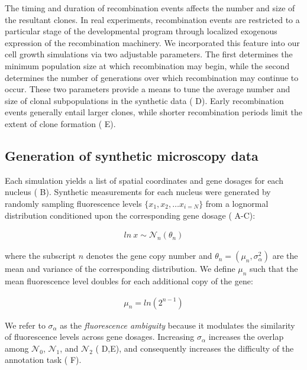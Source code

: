 \documentclass[10pt,letterpaper]{article}
\begin{document}
The timing and duration of recombination events affects the number and size of the resultant clones. In real experiments, recombination events are restricted to a particular stage of the developmental program through localized exogenous expression of the recombination machinery. We incorporated this feature into our cell growth simulations via two adjustable parameters. The first determines the minimum population size at which recombination may begin, while the second determines the number of generations over which recombination may continue to occur. These two parameters provide a means to tune the average number and size of clonal subpopulations in the synthetic data ( D). Early recombination events generally entail larger clones, while shorter recombination periods limit the extent of clone formation ( E).


\subsection*{Generation of synthetic microscopy data}

Each simulation yields a list of spatial coordinates and gene dosages for each nucleus ( B). Synthetic measurements for each nucleus were generated by randomly sampling fluorescence levels $\{x_1, x_2, \ldots x_{i=N} \}$ from a lognormal distribution conditioned upon the corresponding gene dosage ( A-C):
\begin{linenomath} \begin{gather}
ln\ x \sim \mathcal{N}_n(\theta _n)
\end{gather} \end{linenomath}
where the subscript $n$ denotes the gene copy number and $\theta_n = (\mu_n,\sigma_{\alpha}^2)$ are the mean and variance of the corresponding distribution. We define $\mu_n$ such that the mean fluorescence level doubles for each additional copy of the gene:
\begin{linenomath} \begin{gather}
\mu_{n } = ln(2^{n-1})
\end{gather} \end{linenomath}
We refer to $\sigma_{\alpha}$ as the \emph{fluorescence ambiguity} because it modulates the similarity of fluorescence levels across gene dosages. Increasing $\sigma_{\alpha}$ increases the overlap among $\mathcal{N}_0$, $\mathcal{N}_1$, and $\mathcal{N}_2$ ( D,E), and consequently increases the difficulty of the annotation task ( F).
\end{document}
